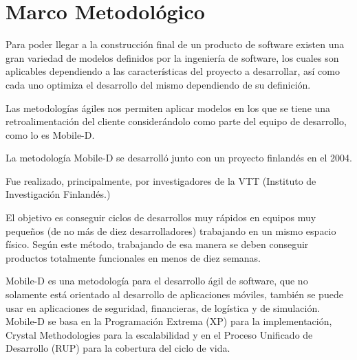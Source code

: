 
\chapter{Marco Metodológico} %

\label{MarcoMetodologico} %



Para poder llegar a la construcción final de un producto de software existen una gran variedad de modelos definidos por la ingeniería de software, los cuales son aplicables dependiendo a las características del proyecto a desarrollar, así como cada uno optimiza el desarrollo del mismo dependiendo de su definición. 

Las metodologías ágiles nos permiten aplicar modelos en los que se tiene una retroalimentación del cliente considerándolo como parte del equipo de desarrollo, como lo es Mobile-D.

La metodología Mobile-D se desarrolló junto con un proyecto finlandés en el 2004.

Fue realizado, principalmente, por investigadores de la VTT (Instituto de Investigación Finlandés.)

El objetivo es conseguir ciclos de desarrollos muy rápidos en equipos muy pequeños (de no más de diez desarrolladores) trabajando en un mismo espacio físico. Según este método, trabajando de esa manera se deben conseguir productos totalmente funcionales en menos de diez semanas.

Mobile-D es una metodología para el desarrollo ágil de software, que no solamente está orientado al desarrollo de aplicaciones móviles, también se puede usar en aplicaciones de seguridad, financieras, de logística y de simulación.
Mobile-D se basa en la Programación Extrema (XP) para la implementación, Crystal Methodologies para la escalabilidad y en el Proceso Unificado de Desarrollo (RUP) para la cobertura del ciclo de vida.


